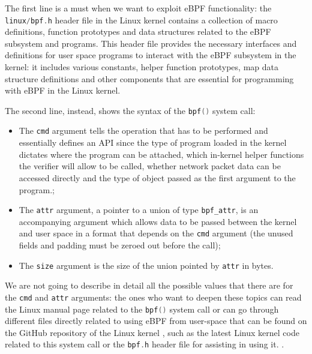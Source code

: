 The first line is a must when we want to exploit eBPF functionality: the \colorbox{backcolour}{\lstinline[style=cstyle, language=C]|linux/bpf.h|} header file in the Linux kernel contains a collection of macro definitions, function prototypes and data structures related to the eBPF subsystem and programs. 
This header file provides the necessary interfaces and definitions for user space programs to interact with the eBPF subsystem in the kernel: it includes various constants, helper function prototypes, map data structure definitions and other components that are essential for programming with eBPF in the Linux kernel.

The second line, instead, shows the syntax of the \colorbox{backcolour}{\lstinline[style=cstyle, language=C]|bpf()|} system call:

\begin{itemize}
	\item 
		The \colorbox{backcolour}{\lstinline[style=cstyle, language=C]|cmd|} argument tells the operation that has to be performed and essentially defines an API since the type of program loaded in the kernel dictates where the program can be attached, which in-kernel helper functions the verifier will allow to be called, whether network packet data can be accessed directly and the type of object passed as the first argument to the program.;
	\item 
		The \colorbox{backcolour}{\lstinline[style=cstyle, language=C]|attr|} argument, a pointer to a union of type \colorbox{backcolour}{\lstinline[style=cstyle, language=C]|bpf_attr|}, is an accompanying argument which allows data to be passed between the kernel and user space in a format that depends on the \colorbox{backcolour}{\lstinline[style=cstyle, language=C]|cmd|} argument (the unused fields and padding must be zeroed out before the call);
	\item 
		The \colorbox{backcolour}{\lstinline[style=cstyle, language=C]|size|} argument is the size of the union pointed by \colorbox{backcolour}{\lstinline[style=cstyle, language=C]|attr|} in bytes.
\end{itemize}

We are not going to describe in detail all the possible values that there are for the \colorbox{backcolour}{\lstinline[style=cstyle, language=C]|cmd|} and \colorbox{backcolour}{\lstinline[style=cstyle, language=C]|attr|} arguments: the ones who want to deepen these topics can read the Linux manual page related to the \colorbox{backcolour}{\lstinline[style=cstyle, language=C]|bpf()|} system call \cite{BPFManPage} or can go through different files directly related to using eBPF from user-space that can be found on the GitHub repository of the Linux kernel \cite{LinuxKernelRepo}, such as the latest Linux kernel code related to this system call \cite{BPFKernelCode} or the \colorbox{backcolour}{\lstinline[style=cstyle, language=C]|bpf.h|} header file \cite{BPFHeader} for assisting in using it.	.

